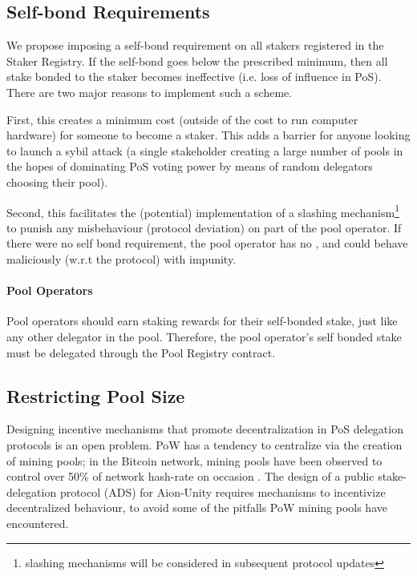 \subsection{Self-bond Requirements} \label{self_bond}
We propose imposing a self-bond requirement on all stakers registered in the Staker Registry. If the self-bond goes below the prescribed minimum, then all stake bonded to the staker becomes ineffective (i.e. loss of influence in PoS). There are two major reasons to implement such a scheme.

First, this creates a minimum cost (outside of the cost to run computer hardware) for someone to become a staker. This adds a barrier for anyone looking to launch a sybil attack (a single stakeholder creating a large number of pools in the hopes of dominating PoS voting power by means of random delegators choosing their pool). 
 
Second, this facilitates the (potential) implementation of a slashing mechanism\footnote{slashing mechanisms will be considered in subsequent protocol updates} to punish any misbehaviour (protocol deviation) on part of the pool operator. If there were no self bond requirement, the pool operator has no , and could behave maliciously (w.r.t the protocol) with impunity. 

\paragraph{Pool Operators} Pool operators should earn staking rewards for their self-bonded stake, just like any other delegator in the pool. Therefore, the pool operator's self bonded stake must be delegated through the Pool Registry contract. 

\subsection{Restricting Pool Size} \label{self_bond_percentage}
Designing incentive mechanisms that promote decentralization in PoS delegation protocols is an open problem. PoW has a tendency to centralize via the creation of mining pools; in the Bitcoin network, mining pools have been observed to control over 50\% of network hash-rate on occasion \cite{RJZ+19}. The design of a public stake-delegation protocol (ADS) for Aion-Unity requires mechanisms to incentivize decentralized behaviour, to avoid some of the pitfalls PoW mining pools have encountered. 

